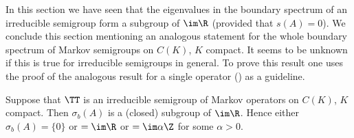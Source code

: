 In this section we have seen that the eigenvalues in the boundary spectrum of an irreducible semigroup form a subgroup of\/ $\im \R$ (provided that $s(A) = 0$).
We conclude this section mentioning an analogous statement for the whole boundary spectrum of Markov semigroups on $C(K)$, $K$ compact.
It seems to be unknown if this is true for irreducible semigroups in general.
To prove this result one uses the proof of the analogous result for a single operator (\cf \textcite[Theorem~7]{schaefer:1968}) as a guideline.
\begin{theorem}\label{thm:b3-3.11}
	Suppose that $\TT$ is an irreducible semigroup of Markov operators%
    on $C(K)$, $K$ compact.
	Then $\sigma_{b}(A)$ is a (closed) subgroup of\/ $\im \R$.
	Hence either $\sigma_{b}(A) = \{0\}$ or $= \im\R$ or $= \im\alpha\Z$ for some $\alpha > 0$.
\end{theorem}
